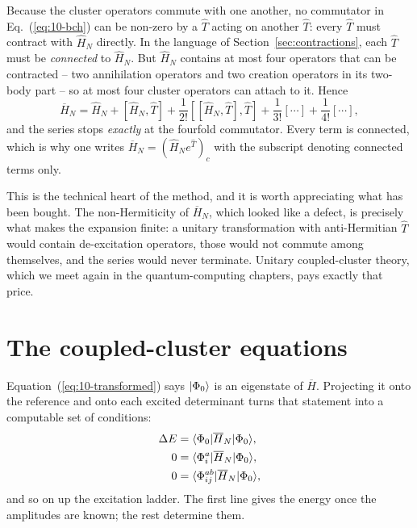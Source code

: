 Because the cluster operators commute with one another, no commutator in
Eq.~(\ref{eq:10-bch}) can be non-zero by a $\hat{T}$ acting on another
$\hat{T}$: every $\hat{T}$ must contract with $\hat{H}_N$ directly.  In the
language of Section~\ref{sec:contractions}, each $\hat{T}$ must be
\emph{connected} to $\hat{H}_N$.  But $\hat{H}_N$ contains at most four
operators that can be contracted -- two annihilation operators and two
creation operators in its two-body part -- so at most four cluster operators
can attach to it.  Hence
\begin{equation}
  \boxed{\;
  \overline{H}_N = \hat{H}_N + \left[\hat{H}_N,\hat{T}\right]
    + \frac{1}{2!}\left[\left[\hat{H}_N,\hat{T}\right],\hat{T}\right]
    + \frac{1}{3!}\left[\cdots\right]
    + \frac{1}{4!}\left[\cdots\right],
  \;}
  \label{eq:10-bchfinite}
\end{equation}
and the series stops \emph{exactly} at the fourfold commutator.  Every term
is connected, which is why one writes $\overline{H}_N=(\hat{H}_Ne^{\hat{T}})_c$
with the subscript denoting connected terms only.

This is the technical heart of the method, and it is worth appreciating what
has been bought.  The non-Hermiticity of $\overline{H}_N$, which looked like
a defect, is precisely what makes the expansion finite: a unitary
transformation with anti-Hermitian $\hat{T}$ would contain de-excitation
operators, those would not commute among themselves, and the series would
never terminate.  Unitary coupled-cluster theory, which we meet again in the
quantum-computing chapters, pays exactly that price.

\section{The coupled-cluster equations}
\label{sec:ccequations}

Equation~(\ref{eq:10-transformed}) says $\vert \Phi_0 \rangle$ is an eigenstate of
$\overline{H}$.  Projecting it onto the reference and onto each excited
determinant turns that statement into a computable set of conditions:
\begin{align}
  \Delta E &= \langle \Phi_0 | \overline{H}_N | \Phi_0 \rangle,
  \label{eq:10-energyeq}\\
  0 &= \langle \Phi_i^a | \overline{H}_N | \Phi_0 \rangle,
  \label{eq:10-singleseq}\\
  0 &= \langle \Phi_{ij}^{ab} | \overline{H}_N | \Phi_0 \rangle,
  \label{eq:10-doubleseq}
\end{align}
and so on up the excitation ladder.  The first line gives the energy once the
amplitudes are known; the rest determine them.

